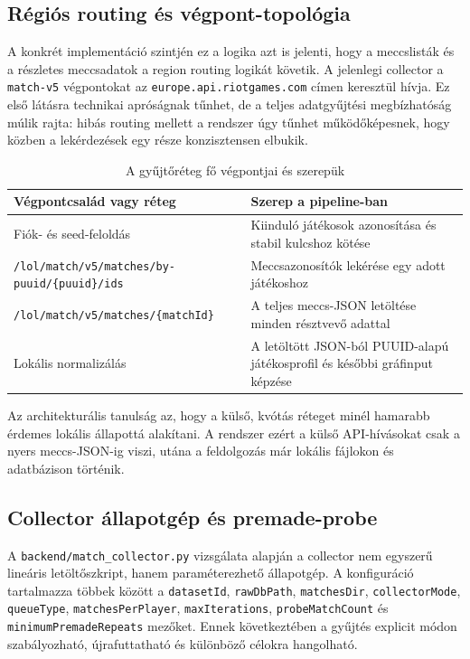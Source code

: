 \documentclass[a4paper,12pt]{report}
\begin{document}
\subsection{Régiós routing és végpont-topológia}

A konkrét implementáció szintjén ez a logika azt is jelenti, hogy a meccslisták és a részletes meccsadatok a region routing logikát követik. A jelenlegi collector a \texttt{match-v5} végpontokat az \texttt{europe.api.riotgames.com} címen keresztül hívja. Ez első látásra technikai apróságnak tűnhet, de a teljes adatgyűjtési megbízhatóság múlik rajta: hibás routing mellett a rendszer úgy tűnhet működőképesnek, hogy közben a lekérdezések egy része konzisztensen elbukik.

\begin{table}[H]
\centering
\caption{A gyűjtőréteg fő végpontjai és szerepük}
\begin{tabularx}{\textwidth}{>{\raggedright\arraybackslash}p{4.4cm}X}
\toprule
\textbf{Végpontcsalád vagy réteg} & \textbf{Szerep a pipeline-ban} \\
\midrule
Fiók- és seed-feloldás & Kiinduló játékosok azonosítása és stabil kulcshoz kötése \\
\texttt{/lol/match/v5/matches/by-puuid/\{puuid\}/ids} & Meccsazonosítók lekérése egy adott játékoshoz \\
\texttt{/lol/match/v5/matches/\{matchId\}} & A teljes meccs-JSON letöltése minden résztvevő adattal \\
Lokális normalizálás & A letöltött JSON-ból PUUID-alapú játékosprofil és későbbi gráfinput képzése \\
\bottomrule
\end{tabularx}
\end{table}

Az architekturális tanulság az, hogy a külső, kvótás réteget minél hamarabb érdemes lokális állapottá alakítani. A rendszer ezért a külső API-hívásokat csak a nyers meccs-JSON-ig viszi, utána a feldolgozás már lokális fájlokon és adatbázison történik.

\subsection{Collector állapotgép és premade-probe}

A \texttt{backend/match\_collector.py} vizsgálata alapján a collector nem egyszerű lineáris letöltőszkript, hanem paraméterezhető állapotgép. A konfiguráció tartalmazza többek között a \texttt{datasetId}, \texttt{rawDbPath}, \texttt{matchesDir}, \texttt{collectorMode}, \texttt{queueType}, \texttt{matchesPerPlayer}, \texttt{maxIterations}, \texttt{probeMatchCount} és \texttt{minimumPremadeRepeats} mezőket. Ennek következtében a gyűjtés explicit módon szabályozható, újrafuttatható és különböző célokra hangolható.
\end{document}
